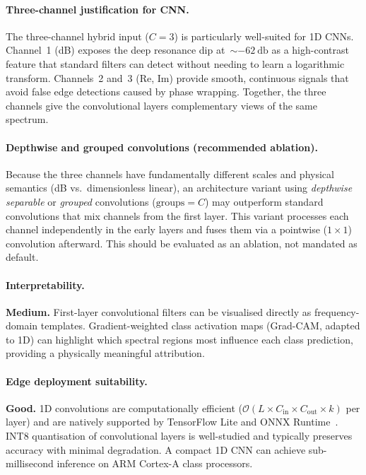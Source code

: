 \paragraph{Three-channel justification for CNN.}
The three-channel hybrid input ($C = 3$) is particularly well-suited
for 1D CNNs.  Channel~1 (dB) exposes the deep resonance dip
at~$\sim\SI{-62}{\decibel}$ as a high-contrast feature that standard
filters can detect without needing to learn a logarithmic transform.
Channels~2 and~3 (Re, Im) provide smooth, continuous signals that avoid
false edge detections caused by phase wrapping.  Together, the three
channels give the convolutional layers complementary views of the
same spectrum.

\paragraph{Depthwise and grouped convolutions (recommended ablation).}
Because the three channels have fundamentally different scales and
physical semantics (dB vs.\ dimensionless linear), an architecture
variant using \emph{depthwise separable} or \emph{grouped}
convolutions ($\text{groups} = C$) may outperform standard
convolutions that mix channels from the first layer.  This variant
processes each channel independently in the early layers and fuses
them via a pointwise ($1 \times 1$) convolution afterward.  This
should be evaluated as an ablation, not mandated as default.

\paragraph{Interpretability.}
\textbf{Medium.}  First-layer convolutional filters can be visualised
directly as frequency-domain templates.  Gradient-weighted class
activation maps (Grad-CAM, adapted to 1D) can highlight which spectral
regions most influence each class prediction, providing a physically
meaningful attribution.

\paragraph{Edge deployment suitability.}
\textbf{Good.}  1D convolutions are computationally efficient
($\mathcal{O}(L \times C_{\text{in}} \times C_{\text{out}} \times k)$
per layer) and are natively supported by TensorFlow Lite and ONNX
Runtime~\cite{tensorflow_lite, onnx_runtime}.  INT8 quantisation of
convolutional layers is well-studied and typically preserves accuracy
with minimal degradation.  A compact 1D CNN can achieve sub-millisecond
inference on ARM Cortex-A class processors.

